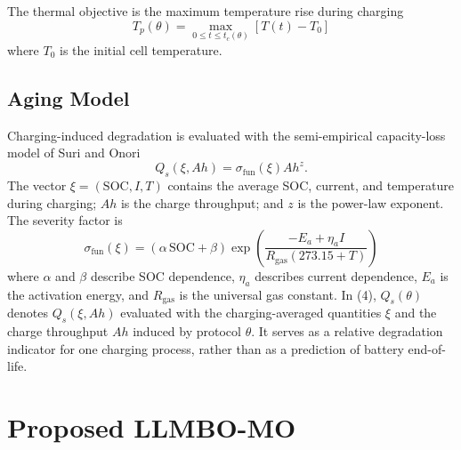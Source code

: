 \documentclass[journal]{IEEEtran}
\begin{document}
The thermal objective is the maximum temperature rise during charging
\begin{equation}
T_p(\theta)=\max_{0\le t\le t_c(\theta)}[T(t)-T_0]
\label{eq:peak_temp}
\end{equation}
where $T_0$ is the initial cell temperature.

\subsection{Aging Model}
\label{sec:aging}

Charging-induced degradation is evaluated with the semi-empirical
capacity-loss model of Suri and Onori~\cite{refAgingModel}
\begin{equation}
Q_s(\xi,Ah)=\sigma_{\mathrm{fun}}(\xi)Ah^z.
\label{eq:aging}
\end{equation}
The vector $\xi=(\mathrm{SOC},I,T)$ contains the average SOC, current, and
temperature during charging; $Ah$ is the charge throughput; and $z$ is the
power-law exponent. The severity factor is
\begin{equation}
\sigma_{\mathrm{fun}}(\xi)=(\alpha\,\mathrm{SOC}+\beta)\exp\!\left(\frac{-E_a+\eta_a I}{R_{\mathrm{gas}}(273.15+T)}\right)
\label{eq:severity}
\end{equation}
where $\alpha$ and $\beta$ describe SOC dependence, $\eta_a$ describes current
dependence, $E_a$ is the activation energy, and $R_{\mathrm{gas}}$ is the
universal gas constant. In (4), $Q_s(\theta)$ denotes $Q_s(\xi,Ah)$
evaluated with the charging-averaged quantities $\xi$ and the charge
throughput $Ah$ induced by protocol $\theta$. It serves as a relative
degradation indicator for one charging process, rather than as a prediction
of battery end-of-life.

\section{Proposed LLMBO-MO}
\label{sec:method}
\end{document}
